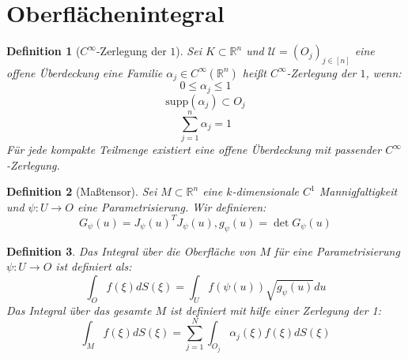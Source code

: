 \documentclass[10pt,a4paper]{article}
\newtheorem{definition}{Definition}
\begin{document}
\section{Oberflächenintegral}
\begin{definition}[$C^\infty$-Zerlegung der $1$]
	Sei $K\subset \mathbb{R}^n$ und $\mathcal{U} = (O_j)_{j\in [n]}$ eine offene Überdeckung eine Familie $\alpha_j\in C^\infty(\mathbb{R}^n)$ heißt $C^\infty$-Zerlegung der $1$, wenn:
	$$0\leq\alpha_j\leq 1$$
	$$\text{supp}(\alpha_j) \subset O_j$$
	$$\sum_{j=1}^n\alpha_j = 1$$
	Für jede kompakte Teilmenge existiert eine offene Überdeckung mit passender $C^\infty$-Zerlegung.
\end{definition}
\begin{definition}[Maßtensor]
	Sei $M\subset\mathbb{R}^n$ eine $k$-dimensionale $C^1$ Mannigfaltigkeit und $\psi: U\to O$ eine Parametrisierung. Wir definieren:
	$$G_\psi(u) = J_\psi(u)^TJ_\psi(u), g_\psi(u) = \det G_\psi(u)$$ 
\end{definition}
\begin{definition}
	Das Integral über die Oberfläche von $M$ für eine Parametrisierung $\psi: U\to O$ ist definiert als:
	$$\int_Of(\xi)dS(\xi) = \int_Uf(\psi(u))\sqrt{g_\psi(u)}du$$
	Das Integral über das gesamte $M$ ist definiert mit hilfe einer Zerlegung der 1:
	$$\int_Mf(\xi)dS(\xi) = \sum_{j=1}^{N} \int_{O_j}\alpha_j(\xi)f(\xi)dS(\xi)$$
\end{definition}
\end{document}
